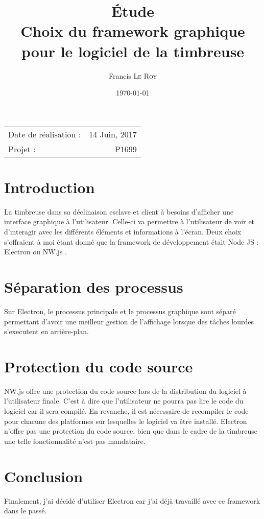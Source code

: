 \documentclass[10pt,a4paper,onecolumn]{article}
\title{Étude \\ Choix du framework graphique \\ pour le logiciel de la timbreuse}
\author{Francis \textsc{Le Roy}}
\date{\today}
\begin{document}
\maketitle
\thispagestyle{fancy}

\begin{center}
\begin{tabular}{l r}
Date de réalisation : & 14 Juin, 2017 \\
Projet : & P1699 \\
\end{tabular}
\end{center}


\section{Introduction}
La timbreuse dans sa déclinaison esclave et client à besoins d'afficher une interface graphique à l'utilisateur. Celle-ci va permettre à l'utilisateur de voir et d'interagir avec les différents éléments et informations à l'écran. Deux choix s'offraient à moi étant donné que la framework de développement était Node JS : Electron \cite{electron} ou NW.js \cite{NW}.
\section{Séparation des processus}
Sur Electron, le processus principale et le processus graphique sont séparé permettant d'avoir une meilleur gestion de l'affichage lorsque des tâches lourdes s'executent en arrière-plan.
\section{Protection du code source}
NW.js offre une protection du code source lors de la distribution du logiciel à l'utilisateur finale. C'est à dire que l'utilisateur ne pourra pas lire le code du logiciel car il sera compilé. En revanche, il est nécessaire de recompiler le code pour chacune des platformes sur lesquelles le logiciel va être installé. Electron n'offre pas une protection du code source, bien que dans le cadre de la timbreuse une telle fonctionnalité n'est pas mandataire.


\section{Conclusion}
Finalement, j'ai décidé d'utiliser Electron car j'ai déjà travaillé avec ce framework dans le passé.

\printbibliography
\end{document}
